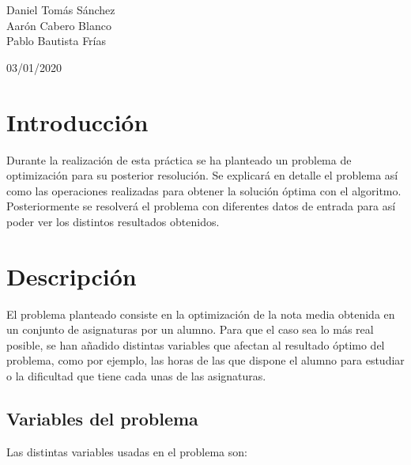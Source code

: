 \documentclass[11pt, a4paper, titlepage]{article}
\begin{document}
	\begin{titlepage}
    	\begin{center}
        	\hrulefill

        	\vspace{0.5cm}
        	{\bf\fontsize{25}{0}{\selectfont{Optimización Heurística\\[0.5cm]}}}
        	\fontsize{15}{0}{\selectfont{Optimizar una calificación\\[0.5cm]}}
        	\hrulefill
        	\vspace{6.0cm}
    	\end{center}

    	\centering
    	{\Large Daniel Tomás Sánchez\\ Aarón Cabero Blanco \\ Pablo Bautista 				Frías \par}
    	\vspace{2cm}
    	{\Large 03/01/2020 \par}
	\end{titlepage}

\newpage


\tableofcontents

\newpage

\section{Introducción}
Durante la realización de esta práctica se ha planteado un problema de optimización para su posterior resolución. Se explicará en detalle el problema así como las operaciones realizadas para obtener la solución óptima con el algoritmo. Posteriormente se resolverá el problema con diferentes datos de entrada para así poder ver los distintos resultados obtenidos.


\section{Descripción}
El problema planteado consiste en la optimización de la nota media obtenida en un conjunto de asignaturas por un alumno. Para que el caso sea lo más real posible, se han añadido distintas variables que afectan al resultado óptimo del problema, como por ejemplo, las horas de las que dispone el alumno para estudiar o la dificultad que tiene cada unas de las asignaturas.

\subsection{Variables del problema}
Las distintas variables usadas en el problema son:
\end{document}
